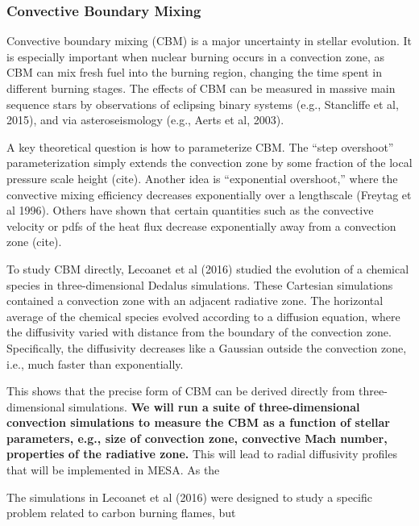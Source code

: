 {\color{purple}
\subsubsection{Convective Boundary Mixing}
}

Convective boundary mixing (CBM) is a major uncertainty in stellar evolution. It is especially important when nuclear burning occurs in a convection zone, as CBM can mix fresh fuel into the burning region, changing the time spent in different burning stages. The effects of CBM can be measured in massive main sequence stars by observations of eclipsing binary systems (e.g., Stancliffe et al, 2015), and via asteroseismology (e.g., Aerts et al, 2003).

A key theoretical question is how to parameterize CBM. The ``step overshoot'' parameterization simply extends the convection zone by some fraction of the local pressure scale height (cite). Another idea is ``exponential overshoot,'' where the convective mixing efficiency decreases exponentially over a lengthscale (Freytag et al 1996). Others have shown that certain quantities such as the convective velocity or pdfs of the heat flux decrease exponentially away from a convection zone (cite).

To study CBM directly, Lecoanet et al (2016) studied the evolution of a chemical species in three-dimensional Dedalus simulations.  These Cartesian simulations contained a convection zone with an adjacent radiative zone. The horizontal average of the chemical species evolved according to a diffusion equation, where the diffusivity varied with distance from the boundary of the convection zone. Specifically, the diffusivity decreases like a Gaussian outside the convection zone, i.e., much faster than exponentially.

This shows that the precise form of CBM can be derived directly from three-dimensional simulations. \textbf{We will run a suite of three-dimensional convection simulations to measure the CBM as a function of stellar parameters, e.g., size of convection zone, convective Mach number, properties of the radiative zone.} This will lead to radial diffusivity profiles that will be implemented in MESA. As the 

The simulations in Lecoanet et al (2016) were designed to study a specific problem related to carbon burning flames, but 
